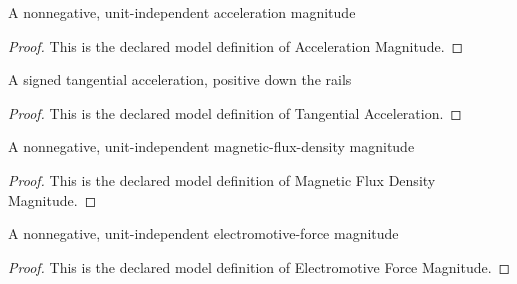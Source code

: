 \begin{definition}
  \label{def:physics:phyx-mini-0981:phyxminiproblems-problemphyxmini0981-accelerationmagnitude}
  A nonnegative, unit-independent acceleration magnitude
\end{definition}
\begin{proof}
  This is the declared model definition of Acceleration Magnitude.
\end{proof}
\begin{definition}
  \label{def:physics:phyx-mini-0981:phyxminiproblems-problemphyxmini0981-tangentialacceleration}
  A signed tangential acceleration, positive down the rails
\end{definition}
\begin{proof}
  This is the declared model definition of Tangential Acceleration.
\end{proof}
\begin{definition}
  \label{def:physics:phyx-mini-0981:phyxminiproblems-problemphyxmini0981-magneticfluxdensitymagnitude}
  A nonnegative, unit-independent magnetic-flux-density magnitude
\end{definition}
\begin{proof}
  This is the declared model definition of Magnetic Flux Density Magnitude.
\end{proof}
\begin{definition}
  \label{def:physics:phyx-mini-0981:phyxminiproblems-problemphyxmini0981-electromotiveforcemagnitude}
  A nonnegative, unit-independent electromotive-force magnitude
\end{definition}
\begin{proof}
  This is the declared model definition of Electromotive Force Magnitude.
\end{proof}
